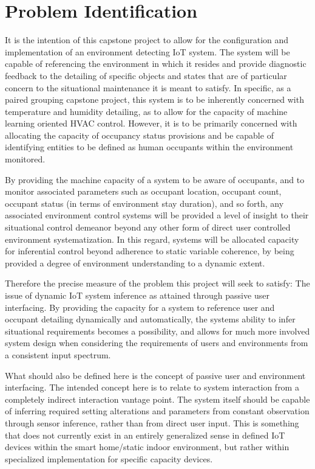 \documentclass{article}
\begin{document}
\section{Problem Identification}
\setlength{\parindent}{1cm} It is the intention of this capstone project to allow for the configuration and implementation of an environment detecting \gls{IoT} system. The system will be capable of referencing the environment in which it resides and provide diagnostic feedback to the detailing of specific objects and states that are of particular concern to the situational maintenance it is meant to satisfy. In specific, as a paired grouping capstone project, this system is to be inherently concerned with temperature and humidity detailing, as to allow for the capacity of machine learning oriented \gls{HVAC} control. However, it is to be primarily concerned with allocating the capacity of occupancy status provisions and be capable of identifying entities to be defined as human occupants within the environment monitored.

By providing the machine capacity of a system to be aware of occupants, and to monitor associated parameters such as occupant location, occupant count, occupant status (in terms of environment stay duration), and so forth, any associated environment control systems will be provided a level of insight to their situational control demeanor beyond any other form of direct user controlled environment systematization. In this regard, systems will be allocated capacity for inferential control beyond adherence to static variable coherence, by being provided a degree of environment understanding to a dynamic extent. 

Therefore the precise measure of the problem this project will seek to satisfy: The issue of dynamic \gls{IoT} system inference as attained through passive user interfacing. By providing the capacity for a system to reference user and occupant detailing dynamically and automatically, the systems ability to infer situational requirements becomes a possibility, and allows for much more involved system design when considering the requirements of users and environments from a consistent input spectrum.  

What should also be defined here is the concept of passive user and environment interfacing. The intended concept here is to relate to system interaction from a completely indirect interaction vantage point. The system itself should be capable of inferring required setting alterations and parameters from constant observation through sensor inference, rather than from direct user input. This is something that does not currently exist in an entirely generalized sense in defined \gls{IoT} devices within the smart home/static indoor environment, but rather within specialized implementation for specific capacity devices.  
\end{document}
